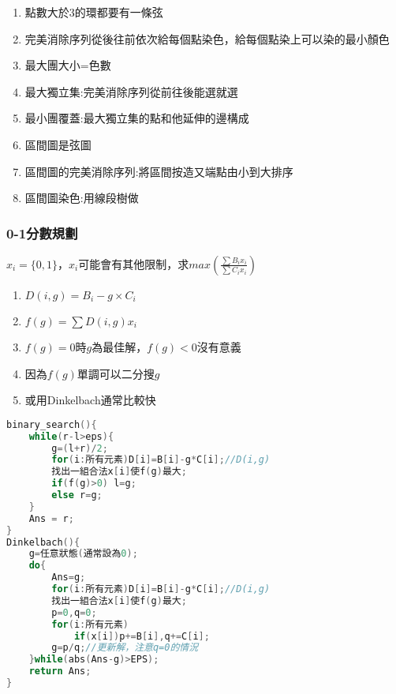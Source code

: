 \begin{enumerate}
	\begin{enumerate}\itemsep = -3pt
	\item 點數大於3的環都要有一條弦
	\item 完美消除序列從後往前依次給每個點染色，給每個點染上可以染的最小顏色
	\item 最大團大小=色數
	\item 最大獨立集:完美消除序列從前往後能選就選
	\item 最小團覆蓋:最大獨立集的點和他延伸的邊構成
	\item 區間圖是弦圖
	\item 區間圖的完美消除序列:將區間按造又端點由小到大排序
	\item 區間圖染色:用線段樹做
	\end{enumerate}
\end{enumerate}

\subsubsection{0-1分數規劃}
$x_i=\{0,1\}$，$x_i$可能會有其他限制，求$max\left(\frac{\sum B_ix_i}{\sum C_ix_i}\right)$
\begin{enumerate}\itemsep = -1pt
\item $D(i,g)=B_i-g\times C_i$
\item $f(g)=\sum D(i,g)x_i$
\item $f(g)=0$時$g$為最佳解，$f(g)<0$沒有意義
\item 因為$f(g)$單調可以二分搜$g$
\item 或用Dinkelbach通常比較快
\end{enumerate}
\begin{lstlisting}[language=C++]
binary_search(){
	while(r-l>eps){
		g=(l+r)/2;
		for(i:所有元素)D[i]=B[i]-g*C[i];//D(i,g) 
		找出一組合法x[i]使f(g)最大;
		if(f(g)>0) l=g;
		else r=g;
	}
	Ans = r;
}
Dinkelbach(){
	g=任意狀態(通常設為0);
	do{
		Ans=g;
		for(i:所有元素)D[i]=B[i]-g*C[i];//D(i,g) 
		找出一組合法x[i]使f(g)最大;
		p=0,q=0;
		for(i:所有元素)
			if(x[i])p+=B[i],q+=C[i];
		g=p/q;//更新解，注意q=0的情況 
	}while(abs(Ans-g)>EPS);
	return Ans;
}
\end{lstlisting}

